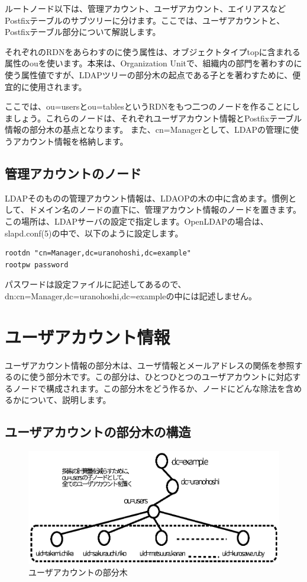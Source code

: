 ルートノード以下は、管理アカウント、ユーザアカウント、エイリアスなどPostfixテーブルのサブツリーに分けます。ここでは、ユーザアカウントと、Postfixテーブル部分について解説します。

それぞれのRDNをあらわすのに使う属性は、オブジェクトタイプtopに含まれる属性のouを使います。本来は、Organization Unitで、組織内の部門を著わすのに使う属性値ですが、LDAPツリーの部分木の起点である子とを著わすために、便宜的に使用されます。

ここでは、ou=usersとou=tablesというRDNをもつ二つのノードを作ることにしましょう。これらのノードは、それぞれユーザアカウント情報とPostfixテーブル情報の部分木の基点となります。
また、cn=Managerとして、LDAPの管理に使うアカウント情報を格納します。

\subsection{管理アカウントのノード}

LDAPそのものの管理アカウント情報は、LDAOPの木の中に含めます。慣例として、ドメイン名のノードの直下に、管理アカウント情報のノードを置きます。この場所は、LDAPサーバの設定で指定します。OpenLDAPの場合は、slapd.conf(5)の中で、以下のように設定します。

\begin{verbatim}
rootdn "cn=Manager,dc=uranohoshi,dc=example"
rootpw password
\end{verbatim}

パスワードは設定ファイルに記述してあるので、dn:cn=Manager,dc=uranohoshi,dc=exampleの中には記述しません。

\section{ユーザアカウント情報}

ユーザアカウント情報の部分木は、ユーザ情報とメールアドレスの関係を参照するのに使う部分木です。この部分は、ひとつひとつのユーザアカウントに対応するノードで構成されます。この部分木をどう作るか、ノードにどんな除法を含めるかについて、説明します。

\subsection{ユーザアカウントの部分木の構造}

\begin{figure}[htbp]
	\includegraphics[width=12cm,clip]{draw/users.eps}
	\caption{ユーザアカウントの部分木}
	\label{fig:users}
\end{figure}

